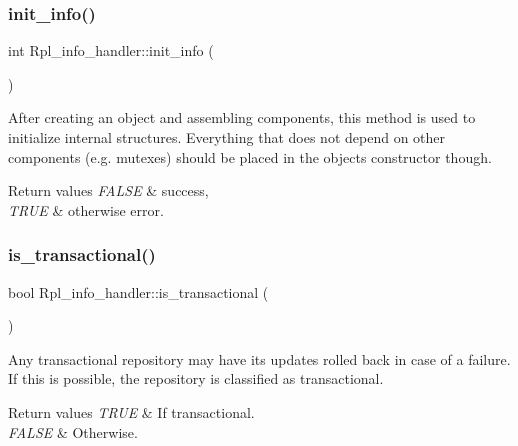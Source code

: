 \subsubsection{\texorpdfstring{init\+\_\+info()}{init\_info()}}
{\footnotesize\ttfamily int Rpl\+\_\+info\+\_\+handler\+::init\+\_\+info (\begin{DoxyParamCaption}{ }\end{DoxyParamCaption})\hspace{0.3cm}{\ttfamily [inline]}}

After creating an object and assembling components, this method is used to initialize internal structures. Everything that does not depend on other components (e.\+g. mutexes) should be placed in the object\textquotesingle{}s constructor though.


\begin{DoxyRetVals}{Return values}
{\em F\+A\+L\+SE} & success, \\
\hline
{\em T\+R\+UE} & otherwise error. \\
\hline
\end{DoxyRetVals}
\mbox{\label{classRpl__info__handler_ae8a2d0ebeccf92a6c5c953a8ec16ab94}} 
\subsubsection{\texorpdfstring{is\+\_\+transactional()}{is\_transactional()}}
{\footnotesize\ttfamily bool Rpl\+\_\+info\+\_\+handler\+::is\+\_\+transactional (\begin{DoxyParamCaption}{ }\end{DoxyParamCaption})\hspace{0.3cm}{\ttfamily [inline]}}

Any transactional repository may have its updates rolled back in case of a failure. If this is possible, the repository is classified as transactional.


\begin{DoxyRetVals}{Return values}
{\em T\+R\+UE} & If transactional. \\
\hline
{\em F\+A\+L\+SE} & Otherwise. \\
\hline
\end{DoxyRetVals}
\mbox{\label{classRpl__info__handler_a844b3bc4a46e6f9c436cd94d4ed9173a}} 
